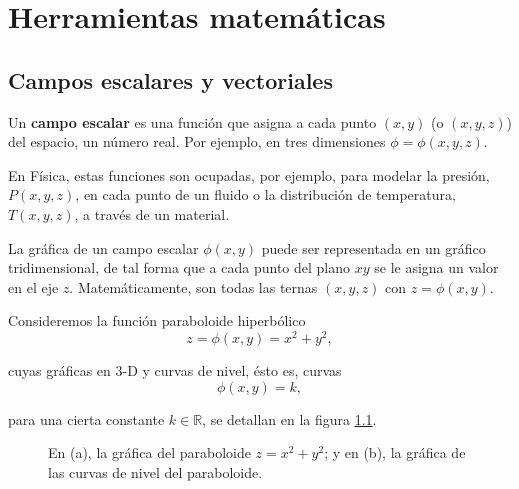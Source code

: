 \chapter{Herramientas matemáticas}

\section{Campos escalares y vectoriales }

Un \textbf{campo escalar} es una función que asigna a cada punto $(x,y)$ (o $(x,y,z)$) del espacio, un número real. Por ejemplo, en tres dimensiones $\phi = \phi(x,y,z)$. 

En Física, estas funciones son ocupadas, por ejemplo, para modelar la presión, $P(x,y,z)$, en cada punto de un fluido o la distribución de temperatura, $T(x,y,z)$, a través de un material. 

La gráfica de un campo escalar $\phi(x,y)$ puede ser representada en un gráfico tridimensional, de tal forma que a cada punto del plano $xy$ se le asigna un valor en el eje $z$. Matemáticamente, son todas las ternas $(x,y,z)$ con $z = \phi(x,y)$. 

\begin{ejemplo}
    Consideremos la función paraboloide hiperbólico
    $$z = \phi(x,y) = x^2+y^2,$$

    cuyas gráficas en 3-D y curvas de nivel, ésto es, curvas
    $$\phi(x,y) = k,$$

    para una cierta constante $k \in \mathbb{R}$, se 
    detallan en la figura \ref{fig:CampoEscalar}.

    \begin{figure}[H]
        \centering
         \hspace{1cm}
        \caption{En (a), la gráfica del paraboloide $z = x^2+y^2$; y en (b), la gráfica de las curvas de nivel del paraboloide.}
        \label{fig:CampoEscalar}
    \end{figure}
\end{ejemplo}

